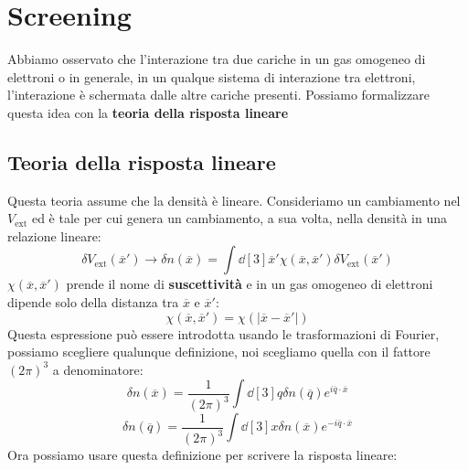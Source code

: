 
\vspace{1.0cm}
\vspace{1.0cm}

\section{Screening}

Abbiamo osservato che l'interazione tra due cariche in un gas omogeneo di elettroni o in generale, in un qualque sistema di interazione tra elettroni, l'interazione è schermata dalle altre cariche presenti. Possiamo formalizzare questa idea con la \textbf{teoria della risposta lineare}

\subsection{Teoria della risposta lineare}
Questa teoria assume che la densità è lineare. Consideriamo un cambiamento nel $V_{\text{ext}}$ ed è tale per cui genera un cambiamento, a sua volta, nella densità in una relazione lineare:
\begin{equation*}
    \delta V_{\text{ext}}(\overline{x}') \longrightarrow \delta n(\overline x) = \int \dd[3]{\overline{x}'}\chi(\overline x, \overline{x}')\delta V_{\text{ext}}(\overline{x}')
\end{equation*}
$\chi(\overline x, \overline{x}')$ prende il nome di \textbf{suscettività} e in un gas omogeneo di elettroni dipende solo della distanza tra $\overline x$ e $\overline{x}'$:
\begin{equation*}
    \chi(\overline x, \overline{x}')=\chi(|\overline x - \overline{x}'|)
\end{equation*}
Questa espressione può essere introdotta usando le trasformazioni di Fourier, possiamo scegliere qualunque definizione, noi scegliamo quella con il fattore $(2\pi)^3$ a denominatore:
\begin{equation*}
    \delta n(\overline x) = \frac{1}{(2\pi)^3}\int \dd[3]{q} \delta n(\overline q) e^{i\overline q \cdot \overline x}
\end{equation*}
\begin{equation*}
    \delta n(\overline q) = \frac{1}{(2\pi)^3}\int \dd[3]{x} \delta n(\overline x) e^{-i\overline q \cdot \overline x}
\end{equation*}
Ora possiamo usare questa definizione per scrivere la risposta lineare:

